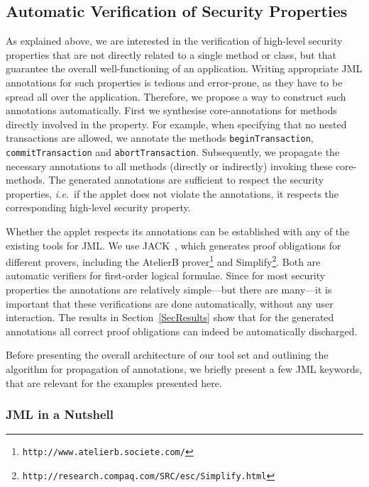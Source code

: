 \subsection{Automatic Verification of Security Properties}\label{SecVerif}

As explained above, we are interested in the verification of
high-level security properties that are not directly related to a
single method or class, but that guarantee the overall
well-functioning of an application. Writing appropriate JML
annotations for such properties is tedious and error-prone, as they
have to be spread all over the application. Therefore, we propose a
way to construct such annotations automatically. First we synthesise
core-annotations for methods directly involved in the property.  For
example, when specifying that no nested transactions are allowed, we
annotate the methods \texttt{beginTransaction},
\texttt{commitTransaction} and
\texttt{abortTransaction}. Subsequently, we propagate the necessary 
annotations to all methods (directly or indirectly) invoking these
core-methods.  The generated annotations are sufficient to respect the
security properties, \emph{i.e.}~if the applet does not violate the
annotations, it respects the corresponding high-level security
property.

Whether the applet respects its annotations can be established with
any of the existing tools for JML. We use JACK~\cite{BurdyRL03}, which
generates proof obligations for different provers, including the
AtelierB prover\footnote{\texttt{http://www.atelierb.societe.com/}}
and
Simplify\footnote{\texttt{http://research.compaq.com/SRC/esc/Simplify.html}}.
Both are automatic verifiers for first-order logical formulae. Since
for most security properties the annotations are relatively
simple---but there are many---it is important that these verifications
are done automatically, without any user interaction. The results in
Section~\ref{SecResults} show that for the generated annotations all
correct proof obligations can indeed be automatically discharged.

Before presenting the overall architecture of our tool set and
outlining the algorithm for propagation of annotations, we briefly
present a few JML keywords, that are relevant for the examples
presented here.

\subsubsection{JML in a Nutshell}\label{SubSecJML}

